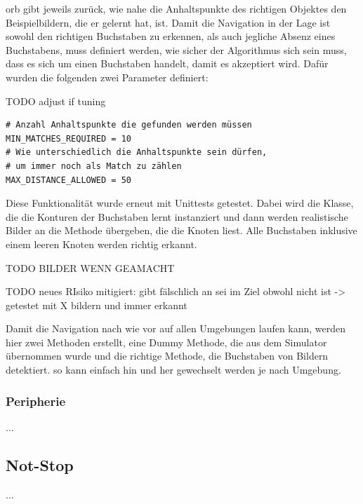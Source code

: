\acrshort{orb} gibt jeweils zurück, wie nahe die Anhaltspunkte des richtigen Objektes den Beispielbildern, die er gelernt hat, ist. Damit die Navigation in der Lage ist sowohl den richtigen Buchstaben zu erkennen, als auch jegliche Absenz eines Buchstabens, muss definiert werden, wie sicher der Algorithmus sich sein muss, dass es sich um einen Buchstaben handelt, damit es akzeptiert wird. Dafür wurden die folgenden zwei Parameter definiert:

TODO adjust if tuning
\begin{verbatim}
# Anzahl Anhaltspunkte die gefunden werden müssen
MIN_MATCHES_REQUIRED = 10
# Wie unterschiedlich die Anhaltspunkte sein dürfen,
# um immer noch als Match zu zählen
MAX_DISTANCE_ALLOWED = 50
\end{verbatim}

Diese Funktionalität wurde erneut mit Unittests getestet.
Dabei wird die Klasse, die die Konturen der Buchstaben lernt instanziert und dann werden realistische Bilder an die Methode übergeben, die die Knoten liest. Alle Buchstaben inklusive einem leeren Knoten werden richtig erkannt.

TODO BILDER WENN GEAMACHT

TODO neues RIsiko mitigiert: gibt fälschlich an sei im Ziel obwohl nicht ist -> getestet mit X bildern und immer erkannt

Damit die Navigation nach wie vor auf allen Umgebungen laufen kann, werden hier zwei Methoden erstellt, eine Dummy Methode, die aus dem Simulator übernommen wurde und die richtige Methode, die Buchstaben von Bildern detektiert. so kann einfach hin und her gewechselt werden je nach Umgebung.

\subsubsection{Peripherie}

...


\newpage
\subsection{Not-Stop}

...
